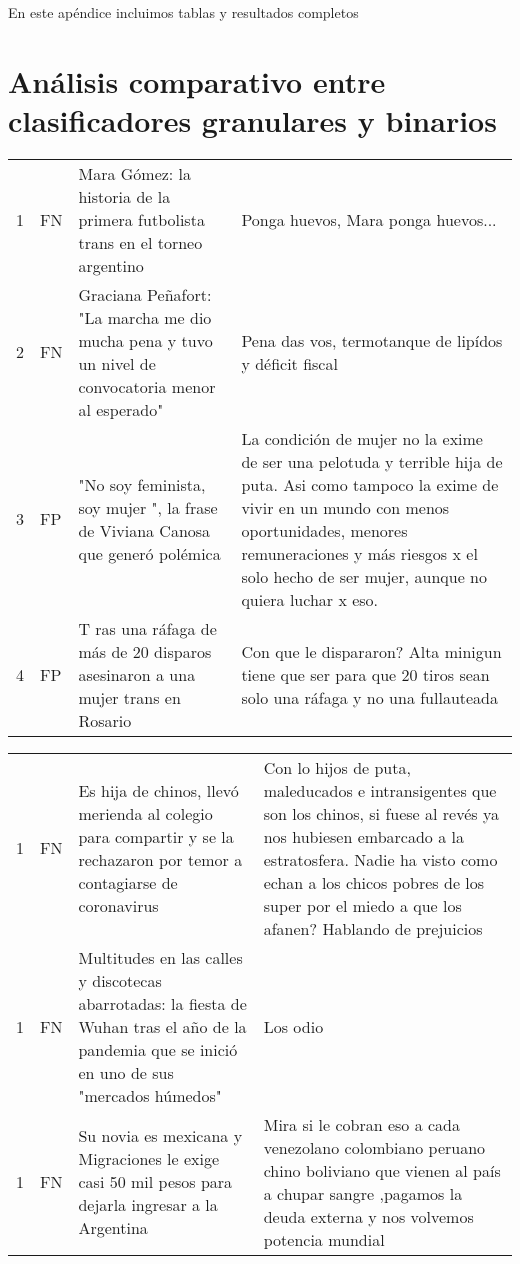 
En este apéndice incluimos tablas y resultados completos


\section{Análisis comparativo entre clasificadores granulares y binarios}


\begin{table}[ht!]
    \centering
    \footnotesize
    \begin{tabular}{p{} p{} p{} p{}}
        \hline
        1 & FN & Mara Gómez: la historia de la primera futbolista trans en el torneo argentino & Ponga huevos, Mara ponga huevos... \\
        2 & FN & Graciana Peñafort: "La marcha me dio mucha pena y tuvo un nivel de convocatoria menor al esperado" & Pena das vos, termotanque de lipídos y déficit fiscal \\
        3 & FP & "No soy feminista, soy mujer ", la frase de Viviana Canosa que generó polémica & La condición de mujer no la exime de ser una pelotuda y terrible hija de puta. Asi como tampoco la exime de vivir en un mundo con menos oportunidades, menores remuneraciones y más riesgos x el solo hecho de ser mujer, aunque no quiera luchar x eso. \\
        4 & FP & T ras una ráfaga de más de 20 disparos asesinaron a una mujer trans en Rosario & Con que le dispararon? Alta minigun tiene que ser para que 20 tiros sean solo una ráfaga y no una fullauteada \\
    \end{tabular}
    \begin{tabular}{p{} p{} p{} p{}}
        1 & FN & Es hija de chinos, llevó merienda al colegio para compartir y se la rechazaron por temor a contagiarse de coronavirus &  Con lo hijos de puta, maleducados e intransigentes que son los chinos, si fuese al revés ya nos hubiesen embarcado a la estratosfera. Nadie ha visto como echan a los chicos pobres de los super por el miedo a que los afanen? Hablando de prejuicios \\
        1 & FN & Multitudes en las calles y discotecas abarrotadas: la fiesta de Wuhan tras el año de la pandemia que se inició en uno de sus "mercados húmedos" &  Los odio \\
        1 & FN & Su novia es mexicana y Migraciones le exige casi 50 mil pesos para dejarla ingresar a la Argentina &  Mira si le cobran eso a cada venezolano colombiano peruano chino boliviano que vienen al país a chupar sangre ,pagamos la deuda externa y nos volvemos potencia mundial \\

\end{tabular}
\end{table}
